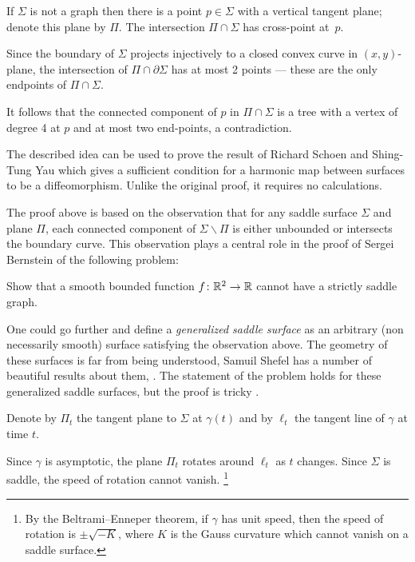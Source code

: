 If $\Sigma$ is not a graph then there is a point $p\in\Sigma$ with a vertical tangent plane;
denote this plane by $\Pi$.
The intersection $\Pi\cap\Sigma$ has cross-point at~$p$.

Since the boundary of $\Sigma$ projects injectively to a closed convex curve in $(x,y)$-plane,
the intersection of $\Pi\cap\partial \Sigma$ has at most 2 points --- these are the only endpoints of $\Pi\cap\Sigma$.

It follows that the connected component of $p$ in $\Pi\cap\Sigma$ is a tree 
with a vertex of degree 4 at $p$ and at most two end-points, a contradiction.\qeds

The described idea can be used to prove the result of Richard Schoen and Shing-Tung  Yau \cite{schoen-yau-2D} which gives a sufficient condition for a harmonic map between surfaces to be a diffeomorphism.
Unlike the original proof, it requires no calculations.

The proof above is based on the observation 
that for any saddle surface $\Sigma$ and plane $\Pi$,
each connected component of $\Sigma\backslash \Pi$ is either unbounded or intersects the boundary curve.
This observation plays a central role in the proof of Sergei Bernstein \cite{bernshtein}
of the following problem:

\begin{pr}
Show that a smooth bounded function $f\colon\mathbb{R}^2\to\mathbb{R}$ cannot have a strictly saddle graph.
\end{pr}

One could go further and define a \emph{generalized saddle surface} as an arbitrary (non necessarily smooth) surface satisfying the observation above.
The geometry of these surfaces is far from being understood,
Samuil Shefel has a number of beautiful results about them, 
\cite[see][and the references therein]{shefel, AKP-invitation}.
The statement of the problem holds for these generalized saddle surfaces, but
the proof is tricky \cite{petrunin-stadler}.


Denote by $\Pi_t$ the tangent plane to $\Sigma$ at $\gamma(t)$ and by $\ell_t$ the tangent line of $\gamma$ at time $t$.

Since $\gamma$ is asymptotic, the plane $\Pi_t$ rotates around $\ell_t$ as $t$ changes.
Since $\Sigma$ is saddle, the speed of rotation cannot vanish.%
\footnote{By the Beltrami--Enneper theorem, if $\gamma$ has unit speed, then the speed of rotation is $\pm\sqrt{-K}$, where $K$ is the Gauss curvature which cannot vanish on a saddle surface.}

